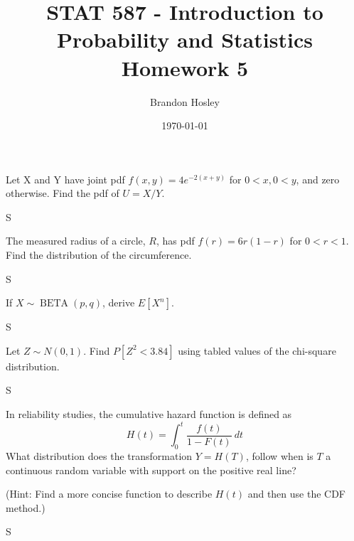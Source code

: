 \documentclass[answers]{exam}
\title{STAT 587 - Introduction to Probability and Statistics%
	\\ Homework 5}
\author{Brandon Hosley}
\date{\today}
\begin{document}
\maketitle
\begin{questions}

\question 
Let X and Y have joint pdf \(f(x,y)=4e^{-2(x+y)}\) for \(0<x,0<y\), and zero otherwise. 
Find the pdf of \(U=X/Y\).
\begin{solution}
	S
\end{solution}

\question 
The measured radius of a circle, \(R\), has pdf \(f(r)=6r(1-r)\) for \(0<r<1\). 
Find the distribution of the circumference.
\begin{solution}
	S
\end{solution}

\question 
If \(X \sim \operatorname{BETA}(p,q)\), derive \(E[X^n]\).
\begin{solution}
	S
\end{solution}

\question 
Let \(Z \sim N(0,1)\). Find \(P[Z^2<3.84]\) using tabled values of the chi-square distribution.
\begin{solution}
	S
\end{solution}

\question 
In reliability studies, the cumulative hazard function is defined as
\[H(t)=\int_{0}^{t}\frac{f(t)}{1-F(t)} \ dt\]
What distribution does the transformation \(Y=H(T)\), 
follow when is \(T\) a continuous random variable with support on the positive real line?

(Hint: Find a more concise function to describe \(H(t)\) and then use the CDF method.)
\begin{solution}
	S
\end{solution}


\end{questions}
\end{document}

